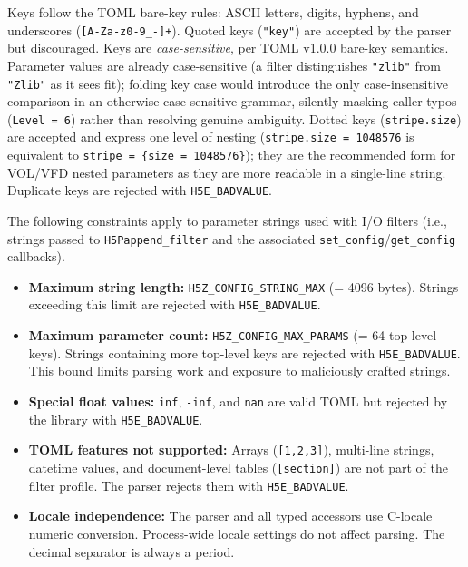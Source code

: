 \documentclass[../RFC-HDFG-2026-001.tex]{subfiles}
\begin{document}

Keys follow the TOML bare-key rules: ASCII letters, digits, hyphens, and
underscores (\texttt{[A-Za-z0-9\_-]+}).  Quoted keys (\texttt{"key"}) are
accepted by the parser but discouraged.  Keys are \emph{case-sensitive},
per TOML v1.0.0 bare-key semantics.  Parameter values are already
case-sensitive (a filter distinguishes \texttt{"zlib"} from
\texttt{"Zlib"} as it sees fit); folding key case would introduce the
only case-insensitive comparison in an otherwise case-sensitive grammar,
silently masking caller typos (\texttt{Level = 6}) rather than resolving
genuine ambiguity.  Dotted keys
(\texttt{stripe.size}) are accepted and express one level of nesting
(\texttt{stripe.size = 1048576} is equivalent to
\texttt{stripe = \{size = 1048576\}}); they are the recommended form for
VOL/VFD nested parameters as they are more readable in a single-line string.
Duplicate keys are rejected with \texttt{H5E\_BADVALUE}.


The following constraints apply to parameter strings used with I/O filters
(i.e., strings passed to \texttt{H5Pappend\_filter} and the associated
\texttt{set\_config}/\texttt{get\_config} callbacks).

\begin{itemize}
\item \textbf{Maximum string length:} \texttt{H5Z\_CONFIG\_STRING\_MAX} (= 4096
  bytes).  Strings exceeding this limit are rejected with
  \texttt{H5E\_BADVALUE}.
\item \textbf{Maximum parameter count:} \texttt{H5Z\_CONFIG\_MAX\_PARAMS} (= 64
  top-level keys).  Strings containing more top-level keys are rejected with
  \texttt{H5E\_BADVALUE}.  This bound limits parsing work and exposure to
  maliciously crafted strings.
\item \textbf{Special float values:} \texttt{inf}, \texttt{-inf}, and
  \texttt{nan} are valid TOML but rejected by the library with
  \texttt{H5E\_BADVALUE}.
\item \textbf{TOML features not supported:} Arrays (\texttt{[1,2,3]}),
  multi-line strings, datetime values, and document-level tables
  (\texttt{[section]}) are not part of the filter profile.  The parser
  rejects them with \texttt{H5E\_BADVALUE}.
\item \textbf{Locale independence:} The parser and all typed accessors use
  C-locale numeric conversion.  Process-wide locale settings do not affect
  parsing.  The decimal separator is always a period.
\end{itemize}
\end{document}

